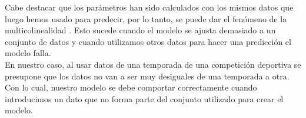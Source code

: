 \documentclass[11pt]{diazessay} %
\begin{document}
Cabe destacar que los parámetros han sido calculados con los mismos datos que luego hemos usado para predecir, por lo tanto, se puede dar el fenómeno de la multicolinealidad \cite{multicol}. Esto sucede cuando el modelo se ajusta demasiado a un conjunto de datos y cuando utilizamos otros datos para hacer una predicción el modelo falla. \\

En nuestro caso, al usar datos de una temporada de una competición deportiva se presupone que los datos no van a ser muy desiguales de una temporada a otra. Con lo cual, nuestro modelo se debe comportar correctamente cuando introducimos un dato que no forma parte del conjunto utilizado para crear el modelo.

\newpage





%
%
%
\end{document}
